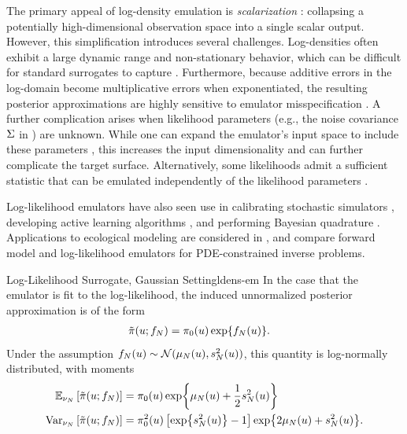\documentclass[12pt]{article}
\begin{document}
The primary appeal of log-density emulation is \textit{scalarization} \citep{ranjan2016inverse, trainDynamics}: 
collapsing a potentially high-dimensional observation space into a single scalar output. 
However, this simplification introduces several challenges. Log-densities often exhibit a large dynamic 
range and non-stationary behavior, which can be difficult for standard surrogates to capture 
\citep{wang2018adaptive, Surer2023sequential}. Furthermore, because additive errors in the log-domain 
become multiplicative errors when exponentiated, the resulting posterior approximations are highly sensitive 
to emulator misspecification \citep{ourSurrPropPaper}. A further complication arises when likelihood 
parameters (e.g., the noise covariance $\Sigma$ in ) are unknown. 
While one can expand the emulator's input space to include these parameters \citep{llikRBF, emPostDens}, this increases 
the input dimensionality and can further complicate the target surface. Alternatively, some likelihoods 
admit a sufficient statistic that can be emulated independently of the likelihood parameters \citep{FerEmulation}.

Log-likelihood emulators have also seen use in calibrating stochastic simulators \citep{OakleyllikEm,llikEmABC,VehtariParallelGP,gpEmMCMC}, 
developing active learning algorithms \citep{JosephMinEnergy,ActiveLearningMCMC,quantileApprox,AlawiehIterativeGP}, 
and performing Bayesian quadrature \citep{BayesQuadrature,BayesQuadRatios}. Applications to 
ecological modeling are considered in \citet{FerEmulation,FATES_CES}, and \citep{GP_PDE_priors}
compare forward model and log-likelihood emulators for PDE-constrained inverse problems.

\begin{examplebox}{Log-Likelihood Surrogate, Gaussian Setting}{ldens-em}
In the case that the emulator is fit to the log-likelihood, the induced unnormalized posterior approximation
is of the form 
\begin{align}
\tilde{\pi}(u; f_{N}) &= \pi_0(u) \exp\mathopen{}\left\{f_{N}(u)\right\}\mathclose{}.
\end{align}
Under the assumption $f_{N}(u) \sim \mathcal{N}(\mu_{N}(u), s^2_{N}(u))$, this
quantity is log-normally distributed, with moments
\begin{align*}
\mathbb{E}_{\nu_{N}}\left[\tilde{\pi}(u; f_{N}) \right] 
&= \pi_0(u)\exp\mathopen{}\left\{\mu_{N}(u) + \frac{1}{2} s^2_{N}(u)\right\}\mathclose{} \\
\mathrm{Var}_{\nu_{N}}\left[\tilde{\pi}(u; f_{N}) \right]
&= \pi_0^2(u) \left[\exp\mathopen{}\left\{s^2_{N}(u)\right\}\mathclose{} - 1 \right] \exp\mathopen{}\left\{2\mu_{N}(u) + s^2_{N}(u)\right\}\mathclose{}.
\end{align*}
\end{examplebox}
\end{document}
